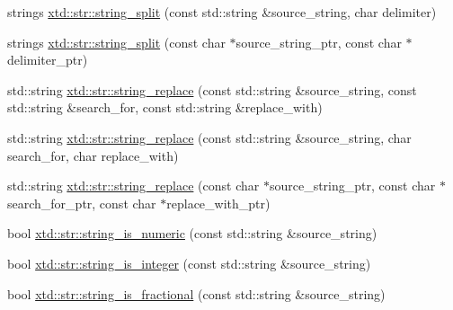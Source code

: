 \begin{DoxyCompactItemize}
\item 
strings \hyperlink{namespacextd_1_1str_a06656216ad0df88bb608e00aaa18eb82}{xtd\-::str\-::string\-\_\-split} (const std\-::string \&source\-\_\-string, char delimiter)
\item 
strings \hyperlink{namespacextd_1_1str_a1e141ef588bb3f2a3f586306377c0ad0}{xtd\-::str\-::string\-\_\-split} (const char $\ast$source\-\_\-string\-\_\-ptr, const char $\ast$delimiter\-\_\-ptr)
\item 
std\-::string \hyperlink{namespacextd_1_1str_a73aeee14b743df341c1b4a66199aa2c2}{xtd\-::str\-::string\-\_\-replace} (const std\-::string \&source\-\_\-string, const std\-::string \&search\-\_\-for, const std\-::string \&replace\-\_\-with)
\item 
std\-::string \hyperlink{namespacextd_1_1str_a76165b3eb4c578f41e935796ed4918c2}{xtd\-::str\-::string\-\_\-replace} (const std\-::string \&source\-\_\-string, char search\-\_\-for, char replace\-\_\-with)
\item 
std\-::string \hyperlink{namespacextd_1_1str_a68fc51d9da10cd350332c3b29633088c}{xtd\-::str\-::string\-\_\-replace} (const char $\ast$source\-\_\-string\-\_\-ptr, const char $\ast$search\-\_\-for\-\_\-ptr, const char $\ast$replace\-\_\-with\-\_\-ptr)
\item 
bool \hyperlink{namespacextd_1_1str_a6d1ae5acb732d24d3be7d1bc4baa7c47}{xtd\-::str\-::string\-\_\-is\-\_\-numeric} (const std\-::string \&source\-\_\-string)
\item 
bool \hyperlink{namespacextd_1_1str_a3b3cf2660283d567c5c46bafd478123e}{xtd\-::str\-::string\-\_\-is\-\_\-integer} (const std\-::string \&source\-\_\-string)
\item 
bool \hyperlink{namespacextd_1_1str_a96ed87d80d055426e2a127049168552c}{xtd\-::str\-::string\-\_\-is\-\_\-fractional} (const std\-::string \&source\-\_\-string)
\end{DoxyCompactItemize}
